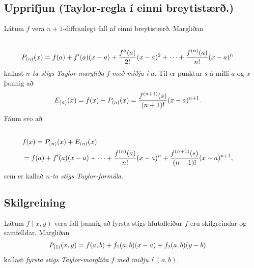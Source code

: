 \documentclass[a4paper,10pt,icelandic]{sphinxmanual}
\begin{document}

\subsection{Upprifjun (Taylor-regla í einni breytistærð.)}
\label{Kafli2:index-30}\label{Kafli2:upprifjun-taylor-regla-i-einni-breytistaer}
Látum \(f\) vera \(n+1\)-diffranlegt fall af einni breytistærð.
Margliðan
\begin{gather}
\begin{split}\displaystyle\end{split}\notag\\\begin{split}P_{(n)}(x)=f(a)+f'(a)(x-a)+\frac{f''(a)}{2!}(x-a)^2
+\cdots+\frac{f^{(n)}(a)}{n!}(x-a)^n\end{split}\notag
\end{gather}
kallast \(n\)\emph{-ta stigs Taylor-margliða} \(f\) \emph{með miðju í}
\(a\). Til er punktur \(s\) á milli \(a\) og \(x\)
þannig að
\begin{gather}
\begin{split}\displaystyle E_{(n)}(x)=f(x)-P_{(n)}(x)=\frac{f^{(n+1)}(s)}{(n+1)!}(x-a)^{n+1}.\end{split}\notag
\end{gather}
Fáum svo að
\begin{gather}
\begin{split}\displaystyle\end{split}\notag\\\begin{split}\begin{aligned}
&f(x)=P_{(n)}(x)+E_{(n)}(x) \\
&=f(a)+f'(a)(x-a)+\cdots+\frac{f^{(n)}(a)}{n!}(x-a)^n
+\frac{f^{(n+1)}(s)}{(n+1)!}(x-a)^{n+1}, \end{aligned}\end{split}\notag
\end{gather}
sem er kallað \(n\)\emph{-ta stigs Taylor-formúla.}


\subsection{Skilgreining}
\label{Kafli2:id51}\label{Kafli2:index-31}
Látum \(f(x,y)\) vera fall þannig að fyrsta stigs hlutafleiður
\(f\) eru skilgreindar og samfelldar. Margliðan
\begin{gather}
\begin{split}\displaystyle P_{(1)}(x,y)=f(a,b)+f_1(a,b)(x-a)+f_2(a,b)(y-b)\end{split}\notag
\end{gather}
kallast \emph{fyrsta stigs Taylor-margliða} \(f\) \emph{með miðju í}
\((a,b)\).
\end{document}
